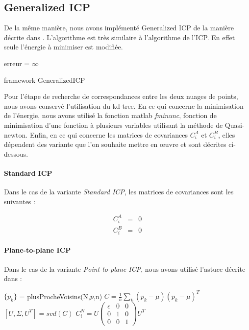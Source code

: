 \subsection{Generalized ICP}
De la même manière, nous avons implémenté Generalized ICP de la manière décrite dans \cite{bib_gicp}. L'algorithme est très similaire à l'algorithme de l'ICP. En effet seule l'énergie à minimiser est modifiée.\\

\begin{algorithm}[H]
erreur = $\infty$\;
\caption{framework GeneralizedICP}
\label{algo_gicp}
\end{algorithm}

Pour l'étape de recherche de correspondances entre les deux nuages de points, nous avons conservé l'utilisation du kd-tree. 
En ce qui concerne la minimisation de l'énergie, nous avons utilisé la fonction matlab \textit{fminunc}, fonction de minimisation d'une fonction à plusieurs variables utilisant la méthode de Quasi-newton.
Enfin, en ce qui concerne les matrices de covariances $C_{i}^{A}$ et $C_{i}^{B}$, elles dépendent des variante que l'on souhaite mettre en œuvre et sont décrites ci-dessous.

\paragraph{Standard ICP}
Dans le cas de la variante \textit{Standard ICP}, les matrices de covariances sont les suivantes :

\begin{eqnarray}
C_{i}^A &=& 0\\
C_{i}^B &=& 0
\end{eqnarray}

\paragraph{Plane-to-plane ICP}

Dans le cas de la variante \textit{Point-to-plane ICP}, nous avons utilisé l'astuce décrite dans \cite{bib_gicp} :

\begin{algorithm}[H]
$\{p_{k}\}$ = plusProcheVoisins(N,$p$,n)\;
$C = \frac{1}{n}\sum_{k}{(p_{k}-\mu)(p_{k}-\mu)^{T}}$\;
$[U,\Sigma,U^{T}] = svd(C)$\;
$C_{i}^{N} = U\begin{pmatrix}
\epsilon & 0 & 0\\
0 & 1 & 0\\
0 & 0 & 1
\end{pmatrix}U^{T}$
\end{algorithm}